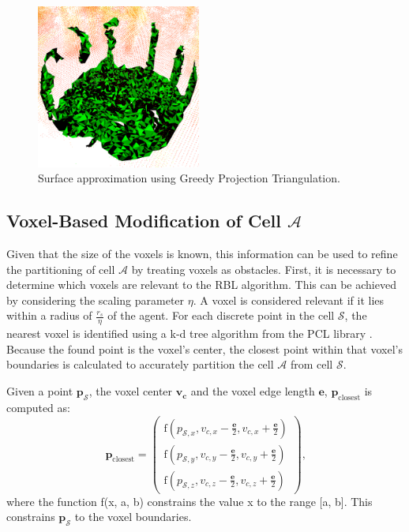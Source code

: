             \begin{figure}[htbp]
                \centering
                \includegraphics[width=0.48\textwidth]{./fig/rviz/triangulation_surface_aprox.png}
                \caption{
                    Surface approximation using Greedy Projection Triangulation.
                }
                \label{fig:triangulation}
            \end{figure}

        \subsection{Voxel-Based Modification of Cell $\mathcal{A}$}
            Given that the size of the voxels is known, this information can be used to refine the partitioning of cell $\mathcal{A}$ by treating voxels as obstacles.
            First, it is necessary to determine which voxels are relevant to the \ac{RBL} algorithm.
            This can be achieved by considering the scaling parameter $\eta$.
            A voxel is considered relevant if it lies within a radius of $\frac{r_s}{\eta}$ of the agent.
            For each discrete point in the cell $\mathcal{S}$, the nearest voxel is identified using a k-d tree algorithm from the PCL library \cite{kd_tree}.
            Because the found point is the voxel's center, the closest point within that voxel's boundaries is calculated to accurately partition the cell $\mathcal{A}$ from cell $\mathcal{S}$.

            Given a point $\mathbf{p_{\mathcal{S}}}$, the voxel center $\mathbf{v_c}$ and the voxel edge length $\mathbf{e}$, $\mathbf{p}_{\text{closest}}$ is computed as: 
            \begin{equation}
                \mathbf{p}_{\text{closest}} =
                \begin{pmatrix}
                    \text{f}(p_{\mathcal{S},x}, v_{c,x} - \frac{\mathbf{e}}{2}, v_{c,x} + \frac{\mathbf{e}}{2}) \\
                    \text{f}(p_{\mathcal{S},y}, v_{c,y} - \frac{\mathbf{e}}{2}, v_{c,y} + \frac{\mathbf{e}}{2}) \\
                    \text{f}(p_{\mathcal{S},z}, v_{c,z} - \frac{\mathbf{e}}{2}, v_{c,z} + \frac{\mathbf{e}}{2})
                \end{pmatrix}\text{,}
            \end{equation}
            where the function f(x, a, b) constrains the value x to the range [a, b].
            This constrains $\mathbf{p_{\mathcal{S}}}$ to the voxel boundaries.
            
